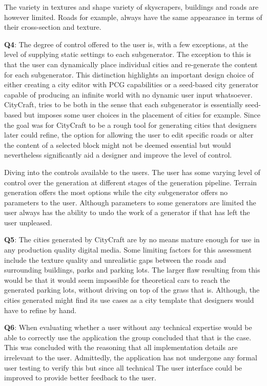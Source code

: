 The variety in textures and shape variety of skyscrapers, buildings and roads are however limited.
Roads for example, always have the same appearance in terms of their cross-section and texture.

\textbf{Q4}:
The degree of control offered to the user is, with a few exceptions, at the level of supplying static settings to each subgenerator.
The exception to this is that the user can dynamically place individual cities and re-generate the content for each subgenerator.
This distinction highlights an important design choice of either creating a city editor with PCG capabilities or a seed-based city generator capable of producing an infinite world with no dynamic user input whatsoever.
CityCraft, tries to be both in the sense that each subgenerator is essentially seed-based but imposes some user choices in the placement of cities for example.
Since the goal was for CityCraft to be a rough tool for generating cities that designers later could refine, the option for allowing the user to edit specific roads or alter the content of a selected block might not be deemed essential but would nevertheless significantly aid a designer and improve the level of control.

Diving into the controls available to the users.
The user has some varying level of control over the generation at different stages of the generation pipeline.
Terrain generation offers the most options while the city subgenerator offers no parameters to the user. 
Although parameters to some generators are limited the user always has the ability to undo the work of a generator if that has left the user unpleased.

\textbf{Q5}:
The cities generated by CityCraft are by no means mature enough for use in any production quality digital media.
Some limiting factors for this assessment include the texture quality and unrealistic gaps between the roads and surrounding buildings, parks and parking lots.
The larger flaw resulting from this would be that it would seem impossible for theoretical cars to reach the generated parking lots, without driving on top of the grass that is.
Although, the cities generated might find its use cases as a city template that designers would have to refine by hand.

\textbf{Q6}:
When evaluating whether a user without any technical expertise would be able to correctly use the application the group concluded that that is the case.
This was concluded with the reasoning that all implementation details are irrelevant to the user.
Admittedly, the application has not undergone any formal user testing to verify this but since all technical 
The user interface could be improved to provide better feedback to the user.

